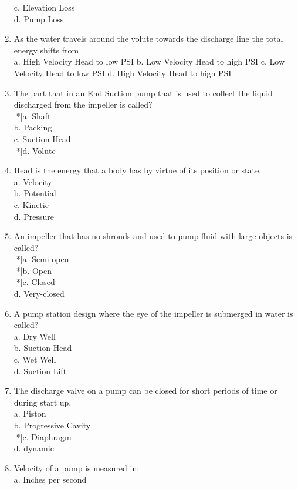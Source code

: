 \begin{enumerate}[1.]
c. Elevation Loss\\
d. Pump Loss\\
\item As the water travels around the volute towards the discharge line the total energy shifts from\\
a. High Velocity Head to low PSI b. Low Velocity Head to high PSI c. Low Velocity Head to low PSI d. High Velocity Head to high PSI\\
\item The part that in an End Suction pump that is used to collect the liquid discharged from the impeller is called?\\
|*|a. Shaft\\
b. Packing\\
c. Suction Head\\
|*|d. Volute\\
\item Head is the energy that a body has by virtue of its position or state.\\
a. Velocity\\
b. Potential\\
c. Kinetic\\
d. Pressure\\
\item An impeller that has no shrouds and used to pump fluid with large objects is called?\\
|*|a. Semi-open\\
|*|b. Open\\
|*|c. Closed\\
d. Very-closed\\
\item A pump station design where the eye of the impeller is submerged in water is called?\\
a. Dry Well\\
b. Suction Head\\
c. Wet Well\\
d. Suction Lift\\
\item The discharge valve on a pump can be closed for short periods of time or during start up.\\
a. Piston\\
b. Progressive Cavity\\
|*|c. Diaphragm\\
d. dynamic\\
\item Velocity of a pump is measured in:\\
a. Inches per second\\

\end{enumerate}

